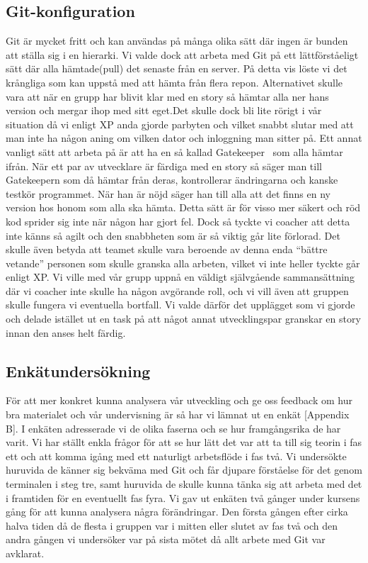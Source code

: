 \subsection{Git-konfiguration}

Git är mycket fritt och kan användas på många olika sätt där ingen är bunden att ställa sig i en hierarki. Vi valde dock att arbeta med Git på ett lättförståeligt sätt där alla hämtade(pull) det senaste från en server. På detta vis löste vi det krångliga som kan uppstå med att hämta från flera repon. Alternativet skulle vara att när en grupp har blivit klar med en story så hämtar alla ner hans version och mergar ihop med sitt eget.Det skulle dock bli lite rörigt i vår situation då vi enligt XP anda gjorde parbyten och vilket snabbt slutar med att man inte ha någon aning om vilken dator och inloggning man sitter på. Ett annat vanligt sätt att arbeta på är att ha en så kallad Gatekeeper~\cite{Gatekeeper} som alla hämtar ifrån. När ett par av utvecklare är färdiga med en story så säger man till Gatekeepern som då hämtar från deras, kontrollerar ändringarna och kanske testkör programmet. När han är nöjd säger han till alla att det finns en ny version hos honom som alla ska hämta. Detta sätt är för visso mer säkert och röd kod sprider sig inte när någon har gjort fel. Dock så tyckte vi coacher att detta inte känns så agilt och den snabbheten som är så viktig går lite förlorad. Det skulle även betyda att teamet skulle vara beroende av denna enda “bättre vetande” personen som skulle granska alla arbeten, vilket vi inte heller tyckte går enligt XP. Vi ville med vår grupp uppnå en väldigt självgående sammansättning där vi coacher inte skulle ha någon avgörande roll, och vi vill även att gruppen skulle fungera vi eventuella bortfall. 
Vi valde därför det upplägget som vi gjorde och delade istället ut en task på att något annat utvecklingspar granskar en story innan den anses helt färdig. 


\subsection{Enkätundersökning}

För att mer konkret kunna analysera vår utveckling och ge oss feedback om hur bra materialet och vår undervisning är så har vi lämnat ut en enkät [Appendix B]. I enkäten adresserade vi de olika faserna och se hur framgångsrika de har varit. Vi har ställt enkla frågor för att se hur lätt det var att ta till sig teorin i fas ett och att komma igång med ett naturligt arbetsflöde i fas två. Vi undersökte huruvida de känner sig bekväma med Git och får djupare förståelse för det genom terminalen i steg tre, samt huruvida de skulle kunna tänka sig att arbeta med det i framtiden för en eventuellt fas fyra. Vi gav ut enkäten två gånger under kursens gång för att kunna analysera några förändringar. Den första gången efter cirka halva tiden då de flesta i gruppen var i mitten eller slutet av fas två och den andra gången vi undersöker var på sista mötet då allt arbete med Git var avklarat.
